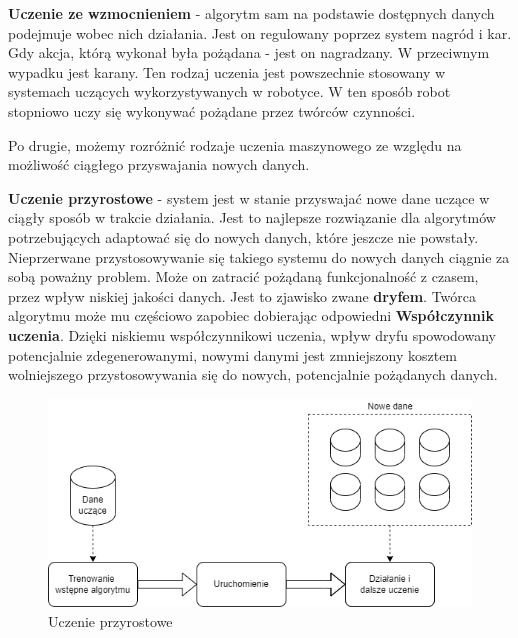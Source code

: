 \begin{description}
\item \textbf{Uczenie ze wzmocnieniem} - algorytm sam na podstawie dostępnych danych podejmuje wobec nich działania. Jest on regulowany poprzez system nagród i kar. Gdy akcja, którą wykonał była pożądana - jest on nagradzany. W przeciwnym wypadku jest karany. Ten rodzaj uczenia jest powszechnie stosowany w systemach uczących wykorzystywanych w robotyce. W ten sposób robot stopniowo uczy się wykonywać pożądane przez twórców czynności.
\end{description}

Po drugie, możemy rozróżnić rodzaje uczenia maszynowego ze względu na możliwość ciągłego przyswajania nowych danych.
\begin{description}
\item \textbf{Uczenie przyrostowe} - system jest w stanie przyswajać nowe dane uczące w ciągły sposób w trakcie działania. Jest to najlepsze rozwiązanie dla algorytmów potrzebujących adaptować się do nowych danych, które jeszcze nie powstały. Nieprzerwane przystosowywanie się takiego systemu do nowych danych ciągnie za sobą poważny problem. Może on zatracić pożądaną funkcjonalność z czasem, przez wpływ niskiej jakości danych. Jest to zjawisko zwane \textbf{dryfem}. Twórca algorytmu może mu częściowo zapobiec dobierając odpowiedni \textbf{Współczynnik uczenia}. Dzięki niskiemu współczynnikowi uczenia, wpływ dryfu spowodowany potencjalnie zdegenerowanymi, nowymi danymi jest zmniejszony kosztem wolniejszego przystosowywania się do nowych, potencjalnie pożądanych danych.

    \begin{figure}[h!]
    \begin{center}
        \includegraphics[scale=0.7]{img/przyrostowe.png}
        \caption{Uczenie przyrostowe}
        \label{fig:uczenie_przyrostowe}    
    \end{center}
    \end{figure}


\end{description}

